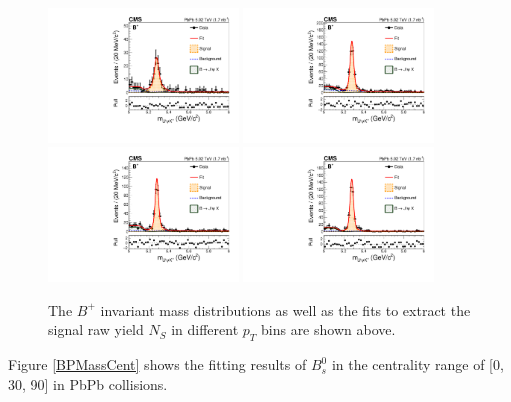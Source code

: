 \begin{figure}[h]
\begin{center}
\includegraphics[width= 0.45\textwidth]{Figures/Chapter4/data_PbPb_1_Bpt_710_doubly0_0_90_ntKp.pdf}
\includegraphics[width= 0.45\textwidth]{Figures/Chapter4/data_PbPb_2_Bpt_1015_doubly0_0_90_ntKp.pdf}
\includegraphics[width= 0.45\textwidth]{Figures/Chapter4/data_PbPb_3_Bpt_1520_doubly0_0_90_ntKp.pdf}
\includegraphics[width= 0.45\textwidth]{Figures/Chapter4/data_PbPb_4_Bpt_2050_doubly0_0_90_ntKp.pdf}
\caption{The $B^+$ invariant mass distributions as well as the fits to extract the signal raw yield $N_{S}$ in different $p_T$ bins are shown above.}
\label{BPMassPt}
\end{center}
\end{figure}

Figure \ref{BPMassCent} shows the fitting results of $B^0_s$ in the centrality range of [0, 30, 90] in PbPb collisions.  

